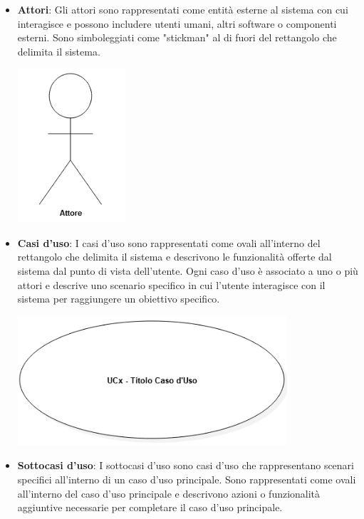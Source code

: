 \begin{itemize}
	\item \textbf{Attori}: Gli attori sono rappresentati come entità esterne al sistema con cui interagisce e possono includere utenti umani, altri software o componenti esterni. Sono simboleggiati come "stickman" al di fuori del rettangolo che delimita il sistema.
	\begin{center}
		\includegraphics*[width=4cm]{../../../images/norme_di_progetto/attore.png}
	\end{center} \newpage
	\item \textbf{Casi d'uso}: I casi d'uso sono rappresentati come ovali all'interno del rettangolo che delimita il sistema e descrivono le funzionalità offerte dal sistema dal punto di vista dell'utente. Ogni caso d'uso è associato a uno o più attori e descrive uno scenario specifico in cui l'utente interagisce con il sistema per raggiungere un obiettivo specifico.
	\begin{center}
		\includegraphics*[width=10cm]{../../../images/norme_di_progetto/casoDiUso.png}
	\end{center}
	\item \textbf{Sottocasi d'uso}: I sottocasi d'uso sono casi d'uso che rappresentano scenari specifici all'interno di un caso d'uso principale. Sono rappresentati come ovali all'interno del caso d'uso principale e descrivono azioni o funzionalità aggiuntive necessarie per completare il caso d'uso principale.
	\begin{center}

\end{center}
\end{itemize}
